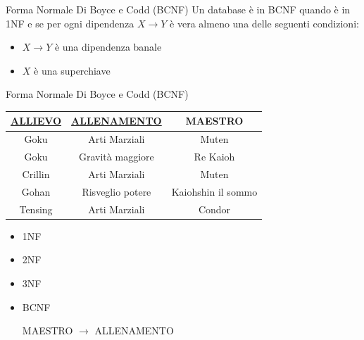 \begin{frame}{Forma Normale Di Boyce e Codd (BCNF)}
    Un database \`e in BCNF quando \`e in 1NF e se per ogni dipendenza $X \rightarrow Y$ \`e vera almeno una delle seguenti condizioni:
\begin{itemize}
    \item $X \rightarrow Y$ \`e una dipendenza banale
    \item $X$ \`e una superchiave
\end{itemize}
\vspace{0.8cm}

\end{frame}
%
\begin{frame}{Forma Normale Di Boyce e Codd (BCNF)}
    \begin{table}[h]
    \centering
    \begin{tabular}{|c|c|c|}
        \hline
        \rowcolor{cyan!30} \textbf{\underline{ALLIEVO}} & \textbf{\underline{ALLENAMENTO}} & \textbf{MAESTRO} \\ \hline
        Goku & Arti Marziali & Muten \\ \hline
        Goku & Gravit\`a maggiore & Re Kaioh \\ \hline
        Crillin & Arti Marziali & Muten \\ \hline
        Gohan & Risveglio potere & Kaiohshin il sommo \\ \hline
        Tensing & Arti Marziali & Condor \\ \hline
    \end{tabular}
    \begin{itemize}[<+->]
    \item 1NF \checkmark
    \item 2NF \checkmark
    \item 3NF \checkmark
    \item BCNF 

    MAESTRO $ \rightarrow $ ALLENAMENTO
\end{itemize}
\end{table}

\end{frame}

